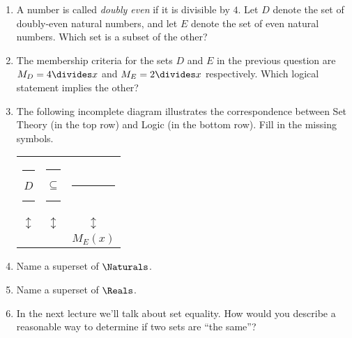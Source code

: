 \documentclass{amsart}
\begin{document}
\begin{enumerate}
\item A number is called {\em doubly even} if it is divisible by $4$.  Let $D$ denote the set of doubly-even natural numbers, and let $E$ denote the set of even natural numbers.  Which set is a subset of the other?

\vfill

\item The membership criteria for the sets $D$ and $E$ in the previous question are $M_D = 4 \divides x$ and $M_E = 2 \divides x$ respectively.  Which logical statement implies the other?

\vfill

\item The following incomplete diagram illustrates the correspondence between Set Theory (in the top row) and Logic (in the bottom row).  Fill in the missing symbols.

\begin{center}
\begin{tabular}{ccc}
\rule[-12pt]{0pt}{36pt} \rule{18pt}{0pt} $D$ \rule{18pt}{0pt} & \rule{18pt}{0pt} $\subseteq$ \rule{18pt}{0pt} & \rule{40pt}{0pt}  \\
\rule[-12pt]{0pt}{36pt}$\updownarrow$ & $\updownarrow$ & $\updownarrow$ \\
\rule[-12pt]{0pt}{36pt}  &    & $M_E(x)$ 
\end{tabular}
\end{center}

\vspace{.5in}

\newpage

\item Name a superset of $\Naturals$.

\vfill

\item Name a superset of $\Reals$.

\vfill

\item In the next lecture we'll talk about set equality.  How would you describe a reasonable way to determine if two sets are ``the same''?

\vfill

\end{enumerate}
\end{document}

